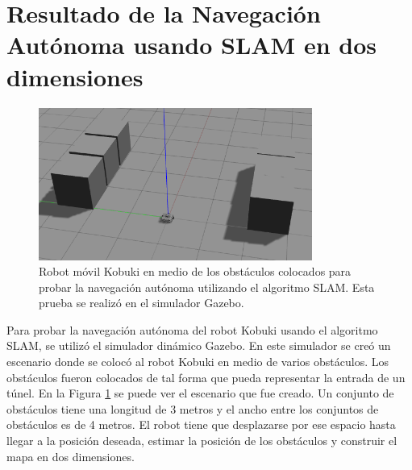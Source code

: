\section{Resultado de la Navegación Autónoma usando SLAM en dos dimensiones}
\begin{figure}%
  \centering \footnotesize
  \includegraphics[width=0.80\textwidth]{images/gazebo_map.png}
  \captionsetup{font=footnotesize}
  \caption{Robot móvil Kobuki en medio de los obstáculos colocados para probar la 
  navegación autónoma utilizando el algoritmo SLAM. Esta prueba se realizó en el
  simulador Gazebo.}
  \label{fig:Gazebo_simu}
\end{figure}
Para probar la navegación autónoma del robot Kobuki usando el algoritmo SLAM, se utilizó
el simulador dinámico Gazebo. En este simulador se creó un escenario donde se colocó al 
robot Kobuki en medio de varios obstáculos. Los obstáculos fueron colocados de tal forma
que pueda representar la entrada de un túnel. En la Figura \ref{fig:Gazebo_simu} se puede
ver el escenario que fue creado. Un conjunto de obstáculos tiene una longitud de 3 metros
y el ancho entre los conjuntos de obstáculos es de 4 metros. El robot tiene que desplazarse
por ese espacio hasta llegar a la posición deseada, estimar la posición de los obstáculos 
y construir el mapa en dos dimensiones.


